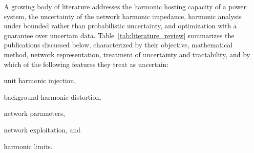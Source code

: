 A growing body of literature addresses the harmonic hosting capacity of a power system, the uncertainty of the network harmonic impedance, harmonic analysis under bounded rather than probabilistic uncertainty, and optimization with a guarantee over uncertain data. Table~\ref{tab:literature_review} summarizes the publications discussed below, characterized by their objective, mathematical method, network representation, treatment of uncertainty and tractability, and by which of the following features they treat as uncertain:
\begin{enumerate*}
    \item [(a)] unit harmonic injection,
    \item [(b)] background harmonic distortion,
    \item [(c)] network parameters,
    \item [(d)] network exploitation, and
    \item [(e)] harmonic limits.
\end{enumerate*}

